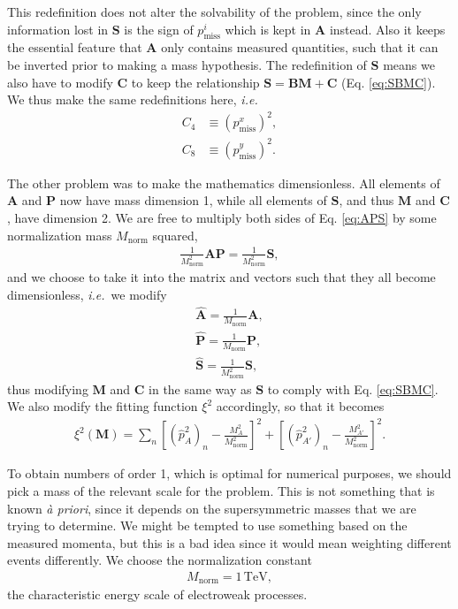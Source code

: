 \documentclass[twoside,english]{uiofysmaster}
\begin{document}
This redefinition does not alter the solvability of the problem, since the only information lost in $\mathbf{S}$ is the sign of $p_\mathrm{miss}^i$ which is kept in $\mathbf{A}$ instead. Also it keeps the essential feature that $\mathbf{A}$ only contains measured quantities, such that it can be inverted prior to making a mass hypothesis. The redefinition of $\mathbf{S}$ means we also have to modify $\mathbf{C}$ to keep the relationship $\mathbf{S} = \mathbf{B} \mathbf{M} + \mathbf{C}$ (Eq. \eqref{eq:SBMC}). We thus make the same redefinitions here, {\it i.e.}
\begin{align}
	C_4 &\equiv (p_\mathrm{miss}^x)^2, \label{eq:Cvec_modified} \\
	C_8 &\equiv (p_\mathrm{miss}^y)^2. \nonumber
\end{align}

The other problem was to make the mathematics dimensionless. All elements of $\mathbf{A}$ and $\mathbf{P}$ now have mass dimension 1, while all elements of $\mathbf{S}$, and thus $\mathbf{M}$ and $\mathbf{C}$, have dimension 2. We are free to multiply both sides of Eq. \eqref{eq:APS} by some normalization mass $M_\mathrm{norm}$ squared,
\begin{align}
	\frac{1}{M_\mathrm{norm}^2} \mathbf{A}\mathbf{P} = \frac{1}{M_\mathrm{norm}^2} \mathbf{S},
\end{align}
and we choose to take it into the matrix and vectors such that they all become dimensionless, {\it i.e.}\ we modify
\begin{align}
	\mathbf{\hat A} = \frac{1}{M_\mathrm{norm}}\mathbf{A},\nonumber \\
	\mathbf{\hat P} = \frac{1}{M_\mathrm{norm}}\mathbf{P},\label{eq:vectors_normalized}\\
	\mathbf{\hat S} = \frac{1}{M_\mathrm{norm}^2}\mathbf{S},\nonumber 
\end{align}
thus modifying $\mathbf{M}$ and $\mathbf{C}$ in the same way as $\mathbf{S}$ to comply with Eq. \eqref{eq:SBMC}. We also modify the fitting function $\xi^2$ accordingly, so that it becomes
\begin{align}
	\xi^2(\mathbf{M}) = \sum_n \left[(\hat p_{A}^2)_n - \frac{M_A^2}{M_\mathrm{norm}^2}\right]^2 + \left[(\hat p_{A'}^2)_n - \frac{M_{A'}^2}{M_\mathrm{norm}^2}\right]^2.
\end{align}

To obtain numbers of order 1, which is optimal for numerical purposes, we should pick a mass of the relevant scale for the problem. This is not something that is known {\it \`a priori}, since it depends on the supersymmetric masses that we are trying to determine. We might be tempted to use something based on the measured momenta, but this is a bad idea since it would mean weighting different events differently. We choose the normalization constant
\begin{align}
	M_\mathrm{norm} = 1 \,\mathrm{TeV},
\end{align}
the characteristic energy scale of electroweak processes.
\end{document}
